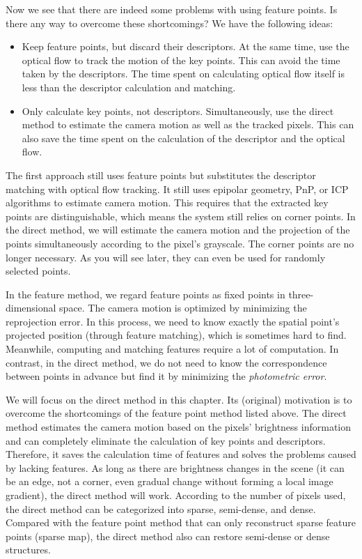 Now we see that there are indeed some problems with using feature points. Is there any way to overcome these shortcomings? We have the following ideas:

\begin{itemize}
	\item Keep feature points, but discard their descriptors. At the same time, use the optical flow to track the motion of the key points. This can avoid the time taken by the descriptors. The time spent on calculating optical flow itself is less than the descriptor calculation and matching.
	\item Only calculate key points, not descriptors. Simultaneously, use the direct method to estimate the camera motion as well as the tracked pixels. This can also save the time spent on the calculation of the descriptor and the optical flow.	
\end{itemize}

The first approach still uses feature points but substitutes the descriptor matching with optical flow tracking. It still uses epipolar geometry, PnP, or ICP algorithms to estimate camera motion. This requires that the extracted key points are distinguishable, which means the system still relies on corner points. In the direct method, we will estimate the camera motion and the projection of the points simultaneously according to the pixel's grayscale. The corner points are no longer necessary. As you will see later, they can even be used for randomly selected points.

In the feature method, we regard feature points as fixed points in three-dimensional space. The camera motion is optimized by minimizing the reprojection error. In this process, we need to know exactly the spatial point's projected position (through feature matching), which is sometimes hard to find. Meanwhile, computing and matching features require a lot of computation. In contrast, in the direct method, we do not need to know the correspondence between points in advance but find it by minimizing the \textit{photometric error}.

We will focus on the direct method in this chapter. Its (original) motivation is to overcome the shortcomings of the feature point method listed above. The direct method estimates the camera motion based on the pixels' brightness information and can completely eliminate the calculation of key points and descriptors. Therefore, it saves the calculation time of features and solves the problems caused by lacking features. As long as there are brightness changes in the scene (it can be an edge, not a corner, even gradual change without forming a local image gradient), the direct method will work. According to the number of pixels used, the direct method can be categorized into sparse, semi-dense, and dense. Compared with the feature point method that can only reconstruct sparse feature points (sparse map), the direct method also can restore semi-dense or dense structures.


